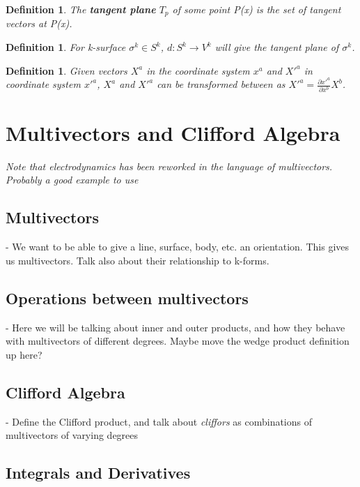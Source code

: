 \documentclass{book}
\newtheorem{defn}[equation]{Definition}
\begin{document}
\begin{defn}
	The \textbf{tangent plane} $T_p$ of some point P(x) is the set of tangent vectors at P(x). 
\end{defn}
 
\begin{defn}
	For k-surface $\sigma^k \in S^k$, $d : S^k \to V^k$ will give the tangent plane of $\sigma^k$. 
\end{defn}

\begin{defn}
	Given vectors $X^a$ in the coordinate system $x^a$ and $X'^a$ in coordinate system $x'^a$, $X^a$ and $X'^a$ can be transformed between as $X'^a = \frac{\partial x'^a}{\partial x^b} X^b$. 
\end{defn}



\section{Multivectors and Clifford Algebra}

\emph{Note that electrodynamics has been reworked in the language of multivectors. Probably a good example to use}

\subsection{Multivectors}

- We want to be able to give a line, surface, body, etc. an orientation. This gives us multivectors. Talk also about their relationship to k-forms. 

\subsection{Operations between multivectors}

- Here we will be talking about inner and outer products, and how they behave with multivectors of different degrees. Maybe move the wedge product definition up here? 

\subsection{Clifford Algebra}

- Define the Clifford product, and talk about \emph{cliffors} as combinations of multivectors of varying degrees

\subsection{Integrals and Derivatives} 
\end{document}
